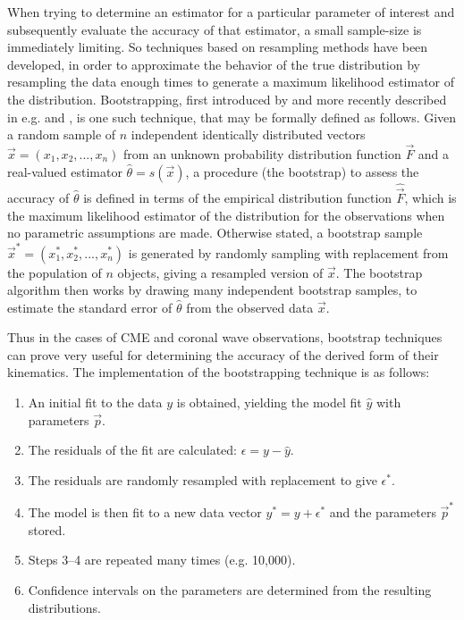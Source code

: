\documentclass[structabstract]{aa}
\begin{document}
When trying to determine an estimator for a particular parameter of interest and subsequently evaluate the accuracy of that estimator, a small sample-size is immediately limiting. So techniques based on resampling methods have been developed, in order to approximate the behavior of the true distribution by resampling the data enough times to generate a maximum likelihood estimator of the distribution. Bootstrapping, first introduced by \citet{Efron:1979p1831} and more recently described in e.g. \citet{1994.book.Efron} and \citet{Chernick1999}, is one such technique, that may be formally defined as follows. Given a random sample of $n$ independent identically distributed vectors $\vec{x} = \left( x_1, x_2, ..., x_n \right)$ from an unknown probability distribution function $\vec{F}$ and a real-valued estimator $\hat{\theta} = s \left( \vec{x} \right)$, a procedure (the bootstrap) to assess the accuracy of $\hat{\theta}$ is defined in terms of the empirical distribution function $\hat{\vec{F}}$, which is the maximum likelihood estimator of the distribution for the observations when no parametric assumptions are made. Otherwise stated, a bootstrap sample $\vec{x}^* = \left( x_1^*, x_2^*, ..., x_n^* \right)$ is generated by randomly sampling with replacement from the population of $n$ objects, giving a resampled version of $\vec{x}$. The bootstrap algorithm then works by drawing many independent bootstrap samples, to estimate the standard error of $\hat{\theta}$ from the observed data $\vec{x}$.

Thus in the cases of CME and coronal wave observations, bootstrap techniques can prove very useful for determining the accuracy of the derived form of their kinematics. The implementation of the bootstrapping technique is as follows:
\begin{enumerate}
\item An initial fit to the data $y$ is obtained, yielding the model fit $\hat{y}$ with parameters $\vec{p}$.
\item The residuals of the fit are calculated: $\epsilon = y - \hat{y}$.
\item The residuals are randomly resampled with replacement to give $\epsilon^*$.
\item The model is then fit to a new data vector $y^* = y + \epsilon^*$ and the parameters $\vec{p}^*$ stored.
\item Steps 3--4 are repeated many times (e.g. 10,000).
\item Confidence intervals on the parameters are determined from the resulting distributions.
\end{enumerate}
\end{document}

